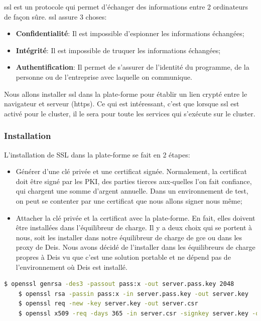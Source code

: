 \begin{onehalfspace}
\acrshort{ssl} est un protocole qui permet d'échanger des informations entre 2 ordinateurs de façon sûre. \acrshort{ssl} assure 3 choses:

\begin{itemize}
	\item \textbf{Confidentialité}: Il est impossible d'espionner les informations échangées;
	\item \textbf{Intégrité}: Il est impossible de truquer les informations échangées;
	\item \textbf{Authentification}: Il permet de s'assurer de l'identité du programme, de la personne ou de l'entreprise avec laquelle on communique.
\end{itemize}



Nous allons installer \acrshort{ssl} dans la plate-forme pour établir un lien crypté entre le navigateur et serveur (\acrshort{https}). Ce qui est intéressant, c'est que lorsque \acrshort{ssl} est activé pour le cluster, il le sera pour toute les services qui s'exécute sur le cluster.



\subsubsection{Installation}

L'installation de SSL dans la plate-forme se fait en 2 étapes:
\begin{itemize}
	\item Générer d'une clé privée et une certificat signée. Normalement, la certificat doit être signé par les PKI, des parties tierces aux-quelles l'on fait confiance, qui chargent une somme d'argent annuelle. Dans un environnement de test, on peut se contenter par une certificat que nous allons signer nous même;
	\item Attacher la clé privée et la certificat avec la plate-forme. En fait, elles doivent être installées dans l'équilibreur de charge. Il y a deux choix qui se portent à nous, soit les installer dans notre équilibreur de charge de \acrshort{gce} ou dans les proxy de Deis. Nous avons décidé de l'installer dans les équilibreurs de charge propres à Deis vu que c'est une solution portable et ne dépend pas de l'environnement où Deis est installé.
\end{itemize}

\begin{lstlisting}[language=bash,caption=Génération de la clé privée eet la certificat]
	$ openssl genrsa -des3 -passout pass:x -out server.pass.key 2048
	$ openssl rsa -passin pass:x -in server.pass.key -out server.key
	$ openssl req -new -key server.key -out server.csr
	$ openssl x509 -req -days 365 -in server.csr -signkey server.key -out server.crt
\end{lstlisting}


\end{onehalfspace}
